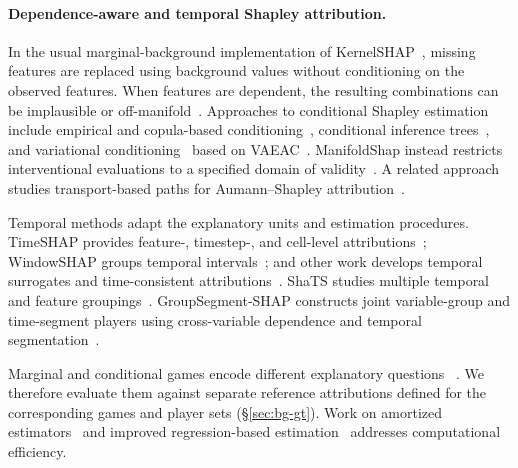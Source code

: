 \paragraph{Dependence-aware and temporal Shapley attribution.}
In the usual marginal-background implementation of KernelSHAP~\citep{lundberg2017unified}, missing features are replaced using background values without conditioning on the observed features. When features are dependent, the resulting combinations can be implausible or off-manifold~\citep{frye2021shapley}. Approaches to conditional Shapley estimation include empirical and copula-based conditioning~\citep{aas2021explaining,aas2021vineexplaining}, conditional inference trees~\citep{redelmeier2020explaining}, and variational conditioning~\citep{olsen2022using} based on VAEAC~\citep{ivanov2018variational}. ManifoldShap instead restricts interventional evaluations to a specified domain of
validity~\citep{taufiq2023manifold}. A related approach studies transport-based paths for Aumann--Shapley attribution~\citep{zhang2026axiomatic}.

Temporal methods adapt the explanatory units and estimation procedures. TimeSHAP provides feature-, timestep-, and cell-level attributions~\citep{bento2021timeshap}; WindowSHAP groups temporal intervals~\citep{NAYEBI2023104438}; and other work develops temporal surrogates and time-consistent attributions~\citep{villani2022feature}. ShaTS studies multiple temporal and feature groupings~\citep{de2025shats}. GroupSegment-SHAP constructs joint variable-group and time-segment players using cross-variable dependence and temporal segmentation~\citep{kim2026groupsegment}.

Marginal and conditional games encode different explanatory questions ~\citep{janzing2020feature,chen2020true,sundararajan2020many, kumar2020problems}. We therefore evaluate them against separate reference attributions defined for the corresponding games and player sets
(\S\ref{sec:bg-gt}). Work on amortized estimators~\citep{jethani2022fastshap} and improved regression-based estimation~\citep{covert2021improving} addresses computational efficiency. 

